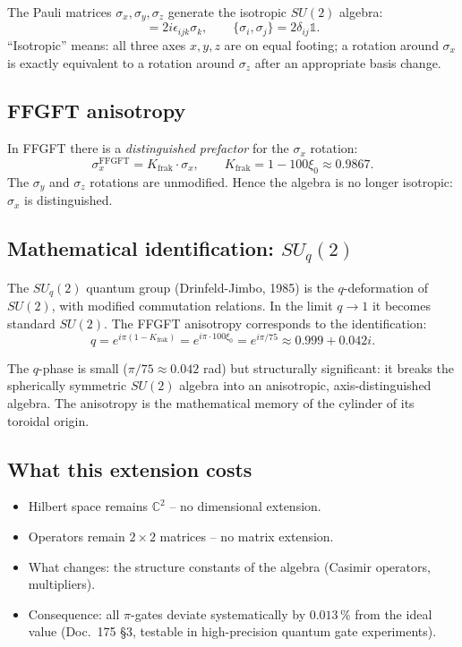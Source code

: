 The Pauli matrices $\sigma_x, \sigma_y, \sigma_z$ generate the
isotropic $SU(2)$ algebra:
\begin{equation}
  [\sigma_i, \sigma_j] = 2i\epsilon_{ijk}\sigma_k,
  \qquad
  \{\sigma_i, \sigma_j\} = 2\delta_{ij}\mathbb{1}.
\end{equation}
\enquote{Isotropic} means: all three axes $x, y, z$ are on equal
footing; a rotation around $\sigma_x$ is exactly equivalent to a
rotation around $\sigma_z$ after an appropriate basis change.

\subsection{FFGFT anisotropy}

In FFGFT there is a \emph{distinguished prefactor} for the $\sigma_x$
rotation:
\begin{equation}
  \sigma_x^{\text{FFGFT}} = K_{\text{frak}} \cdot \sigma_x,
  \qquad
  K_{\text{frak}} = 1 - 100\xi_0 \approx 0.9867.
\end{equation}
The $\sigma_y$ and $\sigma_z$ rotations are unmodified. Hence the
algebra is no longer isotropic: $\sigma_x$ is distinguished.

\subsection{Mathematical identification: $SU_q(2)$}

The $SU_q(2)$ quantum group (Drinfeld-Jimbo, 1985) is the
$q$-deformation of $SU(2)$, with modified commutation relations.
In the limit $q \to 1$ it becomes standard $SU(2)$. The FFGFT
anisotropy corresponds to the identification:
\begin{equation}
  \boxed{
    q = e^{i\pi(1 - K_{\text{frak}})}
      = e^{i\pi \cdot 100\xi_0}
      = e^{i\pi/75}
      \approx 0.999 + 0.042i.
  }
\end{equation}

The $q$-phase is small ($\pi/75 \approx 0.042$ rad) but
structurally significant: it breaks the spherically symmetric
$SU(2)$ algebra into an anisotropic, axis-distinguished algebra. The
anisotropy is the mathematical memory of the cylinder of its
toroidal origin.

\subsection{What this extension costs}

\begin{itemize}[leftmargin=2em,itemsep=2pt,topsep=2pt]
  \item Hilbert space remains $\mathbb{C}^2$ -- no dimensional
        extension.
  \item Operators remain $2\times 2$ matrices -- no matrix
        extension.
  \item What changes: the structure constants of the algebra
        (Casimir operators, multipliers).
  \item Consequence: all $\pi$-gates deviate systematically by
        $0.013\,\%$ from the ideal value (Doc.~175 §3, testable in
        high-precision quantum gate experiments).
\end{itemize}

